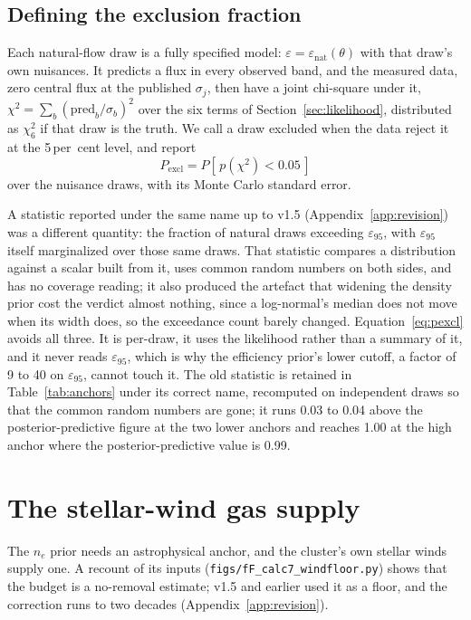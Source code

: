 \documentclass[11pt]{article}
\newcommand{\epsl}{\ensuremath{\varepsilon_{95}}}
\begin{document}
\subsection{Defining the exclusion fraction}
\label{sec:pexcl}

Each natural-flow draw is a fully specified model: $\varepsilon = \varepsilon_{\mathrm{nat}}(\theta)$ with that draw's own nuisances. It predicts a flux in every observed band, and the measured data, zero central flux at the published $\sigma_{j}$, then have a joint chi-square under it, $\chi^{2} = \sum_{b}(\mathrm{pred}_{b}/\sigma_{b})^{2}$ over the six terms of Section~\ref{sec:likelihood}, distributed as $\chi^{2}_{6}$ if that draw is the truth. We call a draw excluded when the data reject it at the 5\,per~cent level, and report
\begin{equation}
P_{\mathrm{excl}} = P\!\left[\,p(\chi^{2}) < 0.05\,\right]
\label{eq:pexcl}
\end{equation}
over the nuisance draws, with its Monte Carlo standard error.

A statistic reported under the same name up to v1.5 (Appendix~\ref{app:revision}) was a different quantity: the fraction of natural draws exceeding \epsl{}, with \epsl{} itself marginalized over those same draws. That statistic compares a distribution against a scalar built from it, uses common random numbers on both sides, and has no coverage reading; it also produced the artefact that widening the density prior cost the verdict almost nothing, since a log-normal's median does not move when its width does, so the exceedance count barely changed. Equation~\ref{eq:pexcl} avoids all three. It is per-draw, it uses the likelihood rather than a summary of it, and it never reads \epsl, which is why the efficiency prior's lower cutoff, a factor of 9 to 40 on \epsl, cannot touch it. The old statistic is retained in Table~\ref{tab:anchors} under its correct name, recomputed on independent draws so that the common random numbers are gone; it runs 0.03 to 0.04 above the posterior-predictive figure at the two lower anchors and reaches 1.00 at the high anchor where the posterior-predictive value is 0.99.

\section{The stellar-wind gas supply}
\label{sec:gas}

The $n_{e}$ prior needs an astrophysical anchor, and the cluster's own stellar winds supply one. A recount of its inputs (\texttt{figs/fF\_calc7\_windfloor.py}) shows that the budget is a no-removal estimate; v1.5 and earlier used it as a floor, and the correction runs to two decades (Appendix~\ref{app:revision}).
\end{document}
